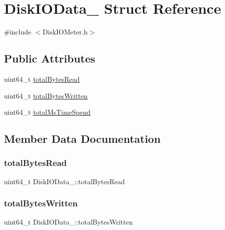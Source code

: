 \hypertarget{structDiskIOData__}{}\section{Disk\+I\+O\+Data\+\_\+ Struct Reference}
\label{structDiskIOData__}


{\ttfamily \#include $<$Disk\+I\+O\+Meter.\+h$>$}

\subsection*{Public Attributes}
\begin{DoxyCompactItemize}
\item 
uint64\+\_\+t \hyperlink{structDiskIOData___a2e6d93de41c004fc17a241d170d2204e}{total\+Bytes\+Read}
\item 
uint64\+\_\+t \hyperlink{structDiskIOData___a1749a801eb29a75206bf3d8ec1bebc72}{total\+Bytes\+Written}
\item 
uint64\+\_\+t \hyperlink{structDiskIOData___a5e6cdf9d3de62cd1f38f032d8510d73d}{total\+Ms\+Time\+Spend}
\end{DoxyCompactItemize}


\subsection{Member Data Documentation}
\mbox{\label{structDiskIOData___a2e6d93de41c004fc17a241d170d2204e}} 
\subsubsection{\texorpdfstring{total\+Bytes\+Read}{totalBytesRead}}
{\footnotesize\ttfamily uint64\+\_\+t Disk\+I\+O\+Data\+\_\+\+::total\+Bytes\+Read}

\mbox{\label{structDiskIOData___a1749a801eb29a75206bf3d8ec1bebc72}} 
\subsubsection{\texorpdfstring{total\+Bytes\+Written}{totalBytesWritten}}
{\footnotesize\ttfamily uint64\+\_\+t Disk\+I\+O\+Data\+\_\+\+::total\+Bytes\+Written}

